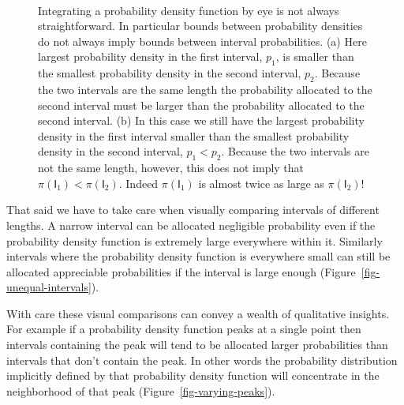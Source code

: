 \documentclass[
  letterpaper,
  DIV=11,
  numbers=noendperiod]{scrartcl}
\begin{document}
\begin{figure}
\begin{minipage}[t]{0.49\linewidth}
{{}

}

\subcaption{\label{fig-unequal-intervals}}
\end{minipage}%
%
\begin{minipage}[t]{0.01\linewidth}

{\centering 

~

}

\end{minipage}%

\caption{\label{fig-area-comps}Integrating a probability density
function by eye is not always straightforward. In particular bounds
between probability densities do not always imply bounds between
interval probabilities. (a) Here largest probability density in the
first interval, \(p_{1}\), is smaller than the smallest probability
density in the second interval, \(p_{2}\). Because the two intervals are
the same length the probability allocated to the second interval must be
larger than the probability allocated to the second interval. (b) In
this case we still have the largest probability density in the first
interval smaller than the smallest probability density in the second
interval, \(p_{1} < p_{2}\). Because the two intervals are not the same
length, however, this does not imply that
\(\pi(\mathsf{I}_{1}) < \pi(\mathsf{I}_{2})\). Indeed
\(\pi(\mathsf{I}_{1})\) is almost twice as large as
\(\pi(\mathsf{I}_{2})\)!}

\end{figure}

That said we have to take care when visually comparing intervals of
different lengths. A narrow interval can be allocated negligible
probability even if the probability density function is extremely large
everywhere within it. Similarly intervals where the probability density
function is everywhere small can still be allocated appreciable
probabilities if the interval is large enough
(Figure~\ref{fig-unequal-intervals}).

With care these visual comparisons can convey a wealth of qualitative
insights. For example if a probability density function peaks at a
single point then intervals containing the peak will tend to be
allocated larger probabilities than intervals that don't contain the
peak. In other words the probability distribution implicitly defined by
that probability density function will concentrate in the neighborhood
of that peak (Figure~\ref{fig-varying-peaks}).
\end{document}
